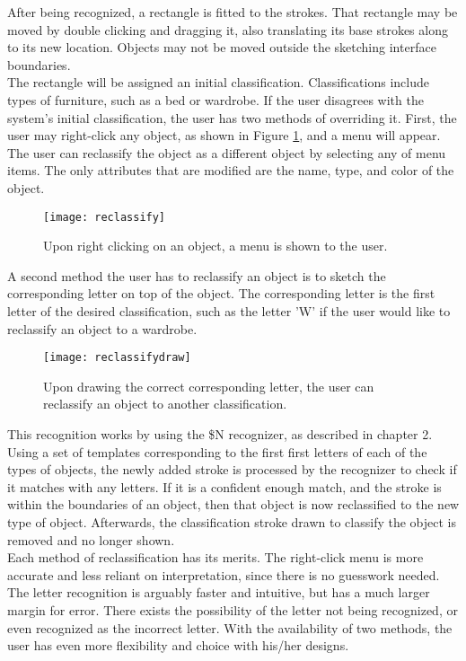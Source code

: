 After being recognized, a rectangle is fitted to the strokes. That rectangle may be moved by double clicking and dragging it, also translating its base strokes along to its new location. Objects may not be moved outside the sketching interface boundaries. \\

The rectangle will be assigned an initial classification. Classifications include types of furniture, such as a bed or wardrobe. If the user disagrees with the system's initial classification, the user has two methods of overriding it. First, the user may right-click any object, as shown in Figure \ref{fig:reclassify}, and a menu will appear. The user can reclassify the object as a different object by selecting any of menu items. The only attributes that are modified are the name, type, and color of the object.

\begin{figure}[ht]
\centering
\texttt{[image: reclassify]}
\caption[Image of the reclassification menu]{Upon right clicking on an object, a menu is shown to the user.}
\label{fig:reclassify}
\end{figure}

A second method the user has to reclassify an object is to sketch the corresponding letter on top of the object. The corresponding letter is the first letter of the desired classification, such as the letter 'W' if the user would like to reclassify an object to a wardrobe.

\begin{figure}[ht]
\centering
\texttt{[image: reclassifydraw]}
\caption[Example of reclassification with recognition]{Upon drawing the correct corresponding letter, the user can reclassify an object to another classification.}
\label{fig:reclassifydraw}
\end{figure}

This recognition works by using the \$N recognizer, as described in chapter 2. Using a set of templates corresponding to the first first letters of each of the types of objects, the newly added stroke is processed by the recognizer to check if it matches with any letters. If it is a confident enough match, and the stroke is within the boundaries of an object, then that object is now reclassified to the new type of object. Afterwards, the classification stroke drawn to classify the object is removed and no longer shown. \\

Each method of reclassification has its merits. The right-click menu is more accurate and less reliant on interpretation, since there is no guesswork needed. The letter recognition is arguably faster and intuitive, but has a much larger margin for error. There exists the possibility of the letter not being recognized, or even recognized as the incorrect letter. With the availability of two methods, the user has even more flexibility and choice with his/her designs. 

